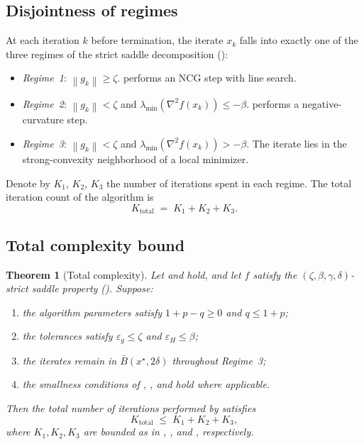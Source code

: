 \documentclass[11pt,a4paper]{article}
\theoremstyle{plain}
\newtheorem{theorem}{Theorem}
\theoremstyle{definition}
\newcommand{\norm}[1]{\left\|#1\right\|}
\newcommand{\eps}{\varepsilon}
\newcommand{\epsg}{\eps_{g}}
\newcommand{\epsH}{\eps_{H}}
\newcommand{\hess}{\nabla^{2}}
\newcommand{\xstar}{x^{\star}}
\begin{document}
\subsection{Disjointness of regimes}\label{subsec:total-disjoint}

At each iteration $k$ before termination, the iterate $x_{k}$ falls into exactly one of the three regimes of the strict saddle decomposition ():
\begin{itemize}[leftmargin=2.5em]
  \item \emph{Regime~1}: $\norm{g_{k}} \geq \zeta$.  performs an NCG step with line search.
  \item \emph{Regime~2}: $\norm{g_{k}} < \zeta$ and $\lambda_{\min}(\hess f(x_{k})) \leq -\beta$.  performs a negative-curvature step.
  \item \emph{Regime~3}: $\norm{g_{k}} < \zeta$ and $\lambda_{\min}(\hess f(x_{k})) > -\beta$. The iterate lies in the strong-convexity neighborhood of a local minimizer.
\end{itemize}
Denote by $K_{1}$, $K_{2}$, $K_{3}$ the number of iterations spent in each regime. The total iteration count of the algorithm is
\begin{equation}\label{eq:K-total-decomp}
K_{\mathrm{total}} \;=\; K_{1} + K_{2} + K_{3}.
\end{equation}

\subsection{Total complexity bound}\label{subsec:total-bound}

\begin{theorem}[Total complexity]\label{thm:total}
Let  and  hold, and let $f$ satisfy the $(\zeta, \beta, \gamma, \delta)$-strict saddle property (). Suppose:
\begin{enumerate}[label=(\roman*), leftmargin=2.5em]
  \item the algorithm parameters satisfy $1 + p - q \geq 0$ and $q \leq 1+p$;
  \item the tolerances satisfy $\epsg \leq \zeta$ and $\epsH \leq \beta$;
  \item the iterates remain in $\bar B(\xstar, 2\delta)$ throughout Regime~3;
  \item the smallness conditions of , , and  hold where applicable.
\end{enumerate}
Then the total number of iterations performed by  satisfies
\begin{equation}\label{eq:K-total}
K_{\mathrm{total}} \;\leq\; K_{1} + K_{2} + K_{3},
\end{equation}
where $K_{1}, K_{2}, K_{3}$ are bounded as in , , and , respectively.
\end{theorem}
\end{document}
